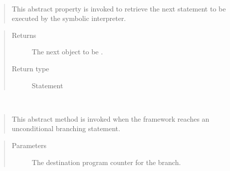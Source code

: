 \documentclass[letterpaper,10pt,english]{sphinxmanual}
\begin{document}
\begin{fulllineitems}
\begin{fulllineitems}
\begin{quote}
\begin{description}
\end{description}\end{quote}

\end{fulllineitems}


\begin{fulllineitems}
\label{\detokenize{index:State.State.current_statement}}~\begin{quote}

\sphinxAtStartPar
This abstract property is invoked to retrieve the next statement to be executed by
the symbolic interpreter.
\end{quote}
\begin{quote}\begin{description}
\item[{Returns}] \leavevmode
\sphinxAtStartPar
The next  object to be .

\item[{Return type}] \leavevmode
\sphinxAtStartPar
Statement

\end{description}\end{quote}

\end{fulllineitems}


\begin{fulllineitems}
\label{\detokenize{index:State.State.jump}}~\begin{quote}

\sphinxAtStartPar
This abstract method is invoked when the framework reaches an unconditional branching statement.
\end{quote}
\begin{quote}\begin{description}
\item[{Parameters}] \leavevmode
\sphinxAtStartPar
{} \textendash{} The destination program counter for the branch.


\end{description}
\end{quote}
\end{fulllineitems}
\end{fulllineitems}
\end{document}
